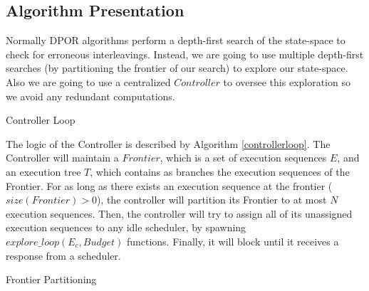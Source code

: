 \subsection{Algorithm Presentation}

Normally DPOR algorithms perform a depth-first search of the state-space to check for erroneous interleavings. Instead, we
are going to use multiple depth-first searches (by partitioning the frontier of our search) to explore our state-space.
Also we are going to use a centralized $Controller$ to oversee this exploration so we avoid any redundant computations.

\begin{algorithm}
    \caption{Controller Loop}
    \label{controllerloop}

\end{algorithm}

The logic of the Controller is described by Algorithm \ref{controllerloop}. The Controller will maintain a $Frontier$, 
which is a set of execution sequences $E$, and an execution tree $T$, which contains
as branches the execution sequences of the Frontier. For as long as there exists an execution sequence at the frontier 
($size(Frontier)>0$), the controller will partition its Frontier to at most $N$ execution sequences. Then, the controller
will try to assign all of its unassigned execution sequences to any idle scheduler, by spawning $explore\_loop(E_c, Budget)$
functions. Finally, it will block until it receives a response from a scheduler.


\begin{algorithm}
    \caption{Frontier Partitioning}
    \label{partition}
\end{algorithm}

